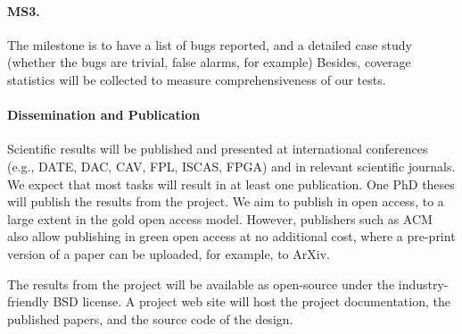 \documentclass[fleqn,12pt]{article}
\begin{document}
\paragraph{MS3.} The milestone  is to have a list of bugs reported, and a detailed case study (whether the bugs are
trivial, false alarms, for example) Besides, coverage statistics will
be collected to measure comprehensiveness of our tests.





\paragraph*{Dissemination and Publication}

Scientific results will be published and presented at international
conferences (e.g., DATE, DAC, CAV, FPL, ISCAS, FPGA) and in relevant scientific journals.
We expect that most tasks will result in at least one publication.
One PhD theses will publish the results from the project.
We aim to publish in open access, to a large extent in the gold open access model.
However, publishers such as ACM also allow publishing in green open access
at no additional cost, where a pre-print version of a paper can be uploaded,
for example, to ArXiv.

The results from the project will be available as open-source under the
industry-friendly BSD license.
A project web site will host the project documentation, the published papers, and the
source code of the design.
\end{document}
